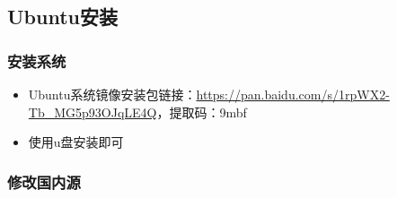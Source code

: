\subsection{Ubuntu安装}
\subsubsection{安装系统}
\begin{itemize}
\item Ubuntu系统镜像安装包链接：\url{https://pan.baidu.com/s/1rpWX2-Tb_MG5p93OJqLE4Q}，提取码：9mbf
\item 使用u盘安装即可
\end{itemize}

\subsubsection{修改国内源}
